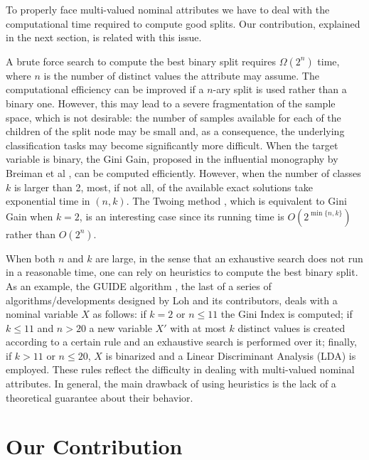 To properly face  multi-valued nominal attributes we have to deal with the computational time required to compute good splits.
Our contribution, explained in the next section, is related with this issue. 
 
A brute force search to compute the best binary split 
requires $\Omega(2^n)$ time, where $n$ is the number of distinct values the attribute may assume. The computational efficiency can be improved if a $n$-ary split is used rather than a binary one. However,  this may lead to a severe fragmentation of the sample space, which is not desirable: the number of samples available for each of the children of the split node 
may be small and, as a consequence, the underlying classification tasks may become significantly more difficult.
When the target variable is binary, the Gini Gain, proposed
in the influential monography by Breiman et al \cite{Breiman84}, can be computed efficiently.
However, when the number of classes $k$ is larger than 2,
most, if not all, of the available exact solutions take exponential time
in $(n,k)$.
The Twoing method \cite{Breiman84}, which is equivalent to
Gini Gain when $k=2$, 
is an  interesting case since its running time is $O(2^{\min\{n,k\}})$ rather than $O( 2^ n)$.

When both $n$ and $k$ are large, in the sense that an exhaustive search does not run in a reasonable time, one can rely on heuristics to compute the best binary split.
As an example, the GUIDE algorithm  \cite{Loh2009}, the  last
of a series of algorithms/developments designed by Loh and its contributors, 
deals with a nominal variable $X$
as follows: if $k=2$ or $n \le 11$ the Gini Index is computed;
if $k \le 11$ and $n > 20$ a new variable $X'$ with at most $k$ distinct values is created according to a certain rule and an exhaustive search is performed over it;  finally, if $k > 11$ or $n \le 20$,  $X$ is binarized and a Linear Discriminant Analysis (LDA) is employed.
These rules reflect the difficulty in dealing with multi-valued nominal attributes.
In general, the main drawback of using heuristics is the lack of a theoretical guarantee about their behavior. 

\section{Our Contribution}
\label{sec:contribution}

